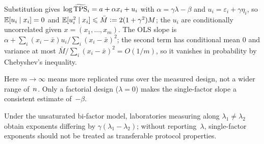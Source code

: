 \begin{Proof}
Substitution gives $\log\widetilde{\mathrm{TPS}}_{i}=a+\alpha x_{i}+u_{i}$ with
$\alpha=\gamma\lambda-\beta$ and $u_{i}=\varepsilon_{i}+\gamma\eta_{i}$, so
$\mathbb{E}[u_{i}\mid x_{i}]=0$ and $\mathbb{E}[u_{i}^{2}\mid x_{i}]\leqslant\bar M\mathrel{\mathop:}=2(1+\gamma^{2})M$;
the $u_{i}$ are conditionally uncorrelated given $x=(x_{1},\dots,x_{m})$. The
OLS slope is $\alpha+\sum_{i}(x_{i}-\bar x)u_{i}/\sum_{i}(x_{i}-\bar x)^{2}$; the
second term has conditional mean $0$ and variance at most
$\bar M/\sum_{i}(x_{i}-\bar x)^{2}=O(1/m)$, so it vanishes in
probability by Chebyshev's inequality.
\end{Proof}

Here $m\to\infty$ means more replicated runs over the measured design, not a
wider range of~$n$. Only a factorial design ($\lambda=0$) makes the
single-factor slope a consistent estimate of~$-\beta$.

\begin{Corollary}
\label{cor:sign}
Under the unsaturated bi-factor model, laboratories measuring along
$\lambda_{1}\ne\lambda_{2}$ obtain exponents differing by
$\gamma(\lambda_{1}-\lambda_{2})$; without reporting~$\lambda$, single-factor
exponents should not be treated as transferable protocol properties.
\end{Corollary}
